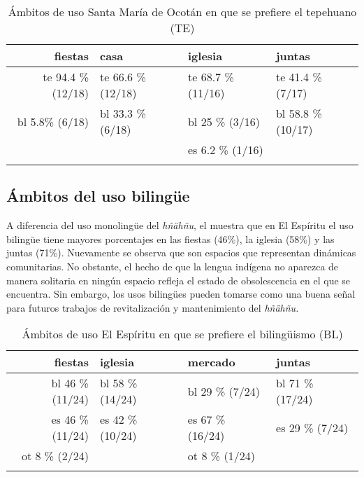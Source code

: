 \documentclass[output=paper]{../langscibook}
\begin{document}
\begin{table}
\caption{\label{tab:guerrero:11} Ámbitos de uso Santa María de Ocotán en que se prefiere el tepehuano (TE)}
\begin{tabularx}{\textwidth}{rYYY}
\lsptoprule
{{fiestas}} & {{casa}} & {{iglesia}} & {{juntas}}\\
\midrule
{{te} {94.4} {\%} {(12/18)}} & {{te} {66.6} {\%} {(12/18)}} & {{te} {68.7} {\%} {(11/16)}} & {{te} {41.4} {\%} {(7/17)}}\\
{{bl} {5.8\%} {(6/18)}} & {{bl} {33.3} {\%} {(6/18)}} & {{bl} 25 \% (3/16)} & {{bl} {58.8} {\%} {(10/17)}}\\
&  & {{es} {6.2} {\%} {(1/16)}} & \\
\lspbottomrule
\end{tabularx}
\end{table}



 \subsection{Ámbitos del uso bilingüe}



A diferencia del uso monolingüe del \textit{hñähñu}, el  muestra que en El Espíritu el uso bilingüe tiene mayores porcentajes en las fiestas (46\%), la iglesia (58\%) y las juntas (71\%). Nuevamente se observa que son espacios que representan dinámicas comunitarias. No obstante, el hecho de que la lengua indígena no aparezca de manera solitaria en ningún espacio refleja el estado de obsolescencia en el que se encuentra. Sin embargo, los usos bilingües pueden tomarse como una buena señal para futuros trabajos de revitalización y mantenimiento del \textit{hñähñu.}

\begin{table}
\caption{\label{tab:guerrero:12} Ámbitos de uso El Espíritu en que se prefiere el bilingüismo (BL)}
\begin{tabularx}{\textwidth}{rYYY}
\lsptoprule
{fiestas} & {{iglesia}} & {{mercado}} & {{juntas}}\\
\midrule
{{bl} {46} {\%} {(11/24)}} & {{bl} {58} {\%} {(14/24)}} & {{bl} {29} {\%} {(7/24)}} & {{bl} {71} {\%} {(17/24)}}\\
{{es} {46} {\%} {(11/24)}} & {{es} {42} {\%} {(10/24)}} & {{es} {67} {\%} {(16/24)}} & {{es} {29} {\%} {(7/24)}}\\
{{ot} {8} {\%} {(2/24)}} &  & {{ot} {8} {\%} {(1/24)}} & \\
\lspbottomrule
\end{tabularx}
\end{table}
\end{document}

